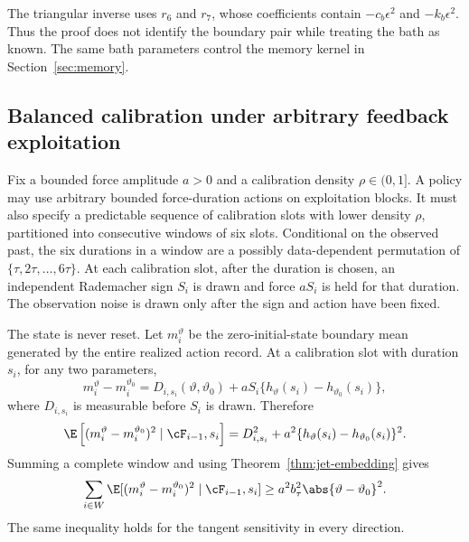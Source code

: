 \begin{remark}
The triangular inverse uses \(r_6\) and \(r_7\), whose coefficients contain
\(-c_b\epsilon^2\) and \(-k_b\epsilon^2\).  Thus the proof does not identify
the boundary pair while treating the bath as known.  The same bath parameters
control the memory kernel in Section~\ref{sec:memory}.
\end{remark}

\subsection{Balanced calibration under arbitrary feedback exploitation}
\label{sec:balanced-design}

Fix a bounded force amplitude \(a>0\) and a calibration density
\(\rho\in(0,1]\).  A policy may use arbitrary bounded force-duration actions
on exploitation blocks.  It must also specify a predictable sequence of
calibration slots with lower density \(\rho\), partitioned into consecutive
windows of six slots.  Conditional on the observed past, the six durations in
a window are a possibly data-dependent permutation of
\(\{\tau,2\tau,\ldots,6\tau\}\).  At each calibration slot, after the
duration is chosen, an independent Rademacher sign \(S_i\) is drawn and force
\(aS_i\) is held for that duration.  The observation noise is drawn only after
the sign and action have been fixed.

The state is never reset.  Let \(m_i^\vartheta\) be the zero-initial-state
boundary mean generated by the entire realized action record.  At a
calibration slot with duration \(s_i\), for any two parameters,
\begin{equation}
 m_i^\vartheta-m_i^{\vartheta_0}
 =D_{i,s_i}(\vartheta,\vartheta_0)
  +aS_i\{h_\vartheta(s_i)-h_{\vartheta_0}(s_i)\},
 \label{eq:sign-decomposition}
\end{equation}
where \(D_{i,s_i}\) is measurable before \(S_i\) is drawn.  Therefore
\begin{equation}
 \E\left[(m_i^\vartheta-m_i^{\vartheta_0})^2
 \mid\cF_{i-1},s_i\right]
 =D_{i,s_i}^2+a^2\{h_\vartheta(s_i)-h_{\vartheta_0}(s_i)\}^2.
 \label{eq:sign-square}
\end{equation}
Summing a complete window and using Theorem~\ref{thm:jet-embedding} gives
\begin{equation}
 \sum_{i\in W}\E[(m_i^\vartheta-m_i^{\vartheta_0})^2
 \mid\cF_{i-1},s_i]
 \ge a^2b_\tau^2\abs{\vartheta-\vartheta_0}^2.
 \label{eq:window-contrast}
\end{equation}
The same inequality holds for the tangent sensitivity in every direction.

